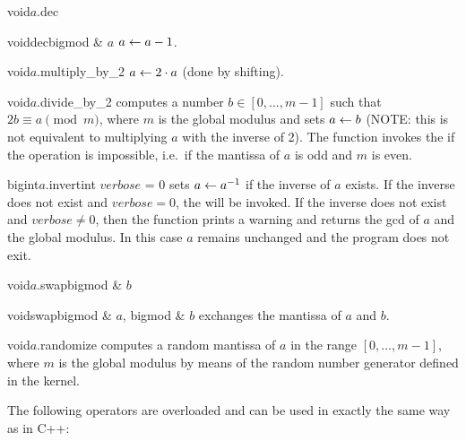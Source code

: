 \begin{fcode}{void}{$a$.dec}{}\end{fcode}
\begin{fcode}{void}{dec}{bigmod & $a$}
  $a \leftarrow a - 1$.
\end{fcode}


\begin{fcode}{void}{$a$.multiply_by_2}{}
  $a \leftarrow 2 \cdot a$ (done by shifting).
\end{fcode}

\begin{fcode}{void}{$a$.divide_by_2}{}
  computes a number $b \in [0, \dots, m - 1]$ such that $2 b \equiv a \pmod m$, where $m$ is the
  global modulus and sets $a \leftarrow b$ (NOTE: this is not equivalent to multiplying $a$ with the
  inverse of 2).  The function invokes the \LEH if the operation is impossible, i.e.~if the
  mantissa of $a$ is odd and $m$ is even.
\end{fcode}

\begin{fcode}{bigint}{$a$.invert}{int $\mathit{verbose}$ = 0}
  sets $a \leftarrow a^{-1}$ if the inverse of $a$ exists.  If the inverse does not exist and
  $\mathit{verbose} = 0$, the \LEH will be invoked.  If the inverse does not exist and
  $\mathit{verbose} \neq 0$, then the function prints a warning and returns the gcd of $a$ and
  the global modulus.  In this case $a$ remains unchanged and the program does not exit.
\end{fcode}

\begin{fcode}{void}{$a$.swap}{bigmod & $b$}\end{fcode}
\begin{fcode}{void}{swap}{bigmod & $a$, bigmod & $b$}
  exchanges the mantissa of $a$ and $b$.
\end{fcode}

\begin{fcode}{void}{$a$.randomize}{}
  computes a random mantissa of $a$ in the range $[0, \dots, m - 1]$, where $m$ is the global
  modulus by means of the random number generator defined in the kernel.
\end{fcode}



\ARTH

The following operators are overloaded and can be used in exactly the same way as in C++:

\begin{center}
\\
\\
\end{center}

